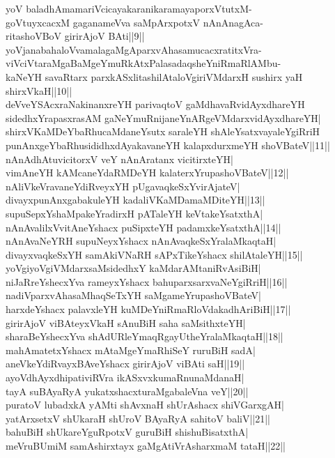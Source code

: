 \documentclass{article}
\begin{document}
yoV baladhAmamariVcicayakaranikaramayaporxVtutxM-\\
goVtuyxcacxM gaganameVva saMpArxpotxV nAnAnagAca-\\
ritashoVBoV girirAjoV BAti||9||\\
yoVjanabahaloVvamalagaMgAparxvAhasamucacxratitxVra-\\
viVciVtaraMgaBaMgeYmuRkAtxPalasadaqsheYniRmaRlAMbu-\\
kaNeYH savaRtarx parxkASxlitashilAtaloVgiriVMdarxH sushirx yaH shirxVkaH||10||\\
deVveYSAcxraNakinanxreYH parivaqtoV gaMdhavaRvidAyxdhareYH\\
sidedhxYrapasxrasAM gaNeYmuRnijaneYnARgeVMdarxvidAyxdhareYH|\\
shirxVKaMDeYbaRhucaMdaneYsutx saraleYH shAleYsatxvayaleYgiRriH\\
punAnxgeYbaRhusididhxdAyakavaneYH kalapxdurxmeYH shoVBateV||11||\\
nAnAdhAtuvicitorxV veY nAnAratanx vicitirxteYH|\\
vimAneYH kAMcaneYdaRMDeYH kalaterxYrupashoVBateV||12||\\
nAliVkeVravaneYdiRveyxYH pUgavaqkeSxYvirAjateV|\\
divayxpunAnxgabakuleYH kadaliVKaMDamaMDiteYH||13||\\
supuSepxYshaMpakeYradirxH pATaleYH keVtakeYsatxthA|\\
nAnAvalilxVvitAneYshacx puSipxteYH padamxkeYsatxthA||14||\\
nAnAvaNeYRH supuNeyxYshacx nAnAvaqkeSxYralaMkaqtaH|\\
divayxvaqkeSxYH samAkiVNaRH sAPxTikeYshacx shilAtaleYH||15||\\
yoVgiyoVgiVMdarxsaMsidedhxY kaMdarAMtaniRvAsiBiH|\\
niJaRreYshecxYva rameyxYshacx bahuparxsarxvaNeYgiRriH||16||\\
nadiVparxvAhasaMhaqSeTxYH saMgameYrupashoVBateV|\\
harxdeYshacx palavxleYH kuMDeYniRmaRloVdakadhAriBiH||17||\\
girirAjoV viBAteyxVkaH sAnuBiH saha saMsithxteYH|\\
sharaBeYshecxYva shAdURleYmaqRgayUtheYralaMkaqtaH||18||\\
mahAmatetxYshacx mAtaMgeYmaRhiSeY ruruBiH sadA|\\
aneVkeYdiRvayxBAveYshacx girirAjoV viBAti saH||19||\\
ayoVdhAyxdhipativiRVra ikASxvxkumaRnunaMdanaH|\\
tayA suBAyaRyA yukatxshacxturaMgabaleVna veY||20||\\
puratoV lubadxkA yAMti shAvxnaH shUrAshacx shiVGarxgAH|\\
yatArxsetxV shUkaraH shUroV BAyaRyA sahitoV baliV||21||\\
bahuBiH shUkareYguRpotxV guruBiH shishuBisatxthA|\\
meVruBUmiM samAshirxtayx gaMgAtiVrAsharxmaM tataH||22||\\
\end{document}
